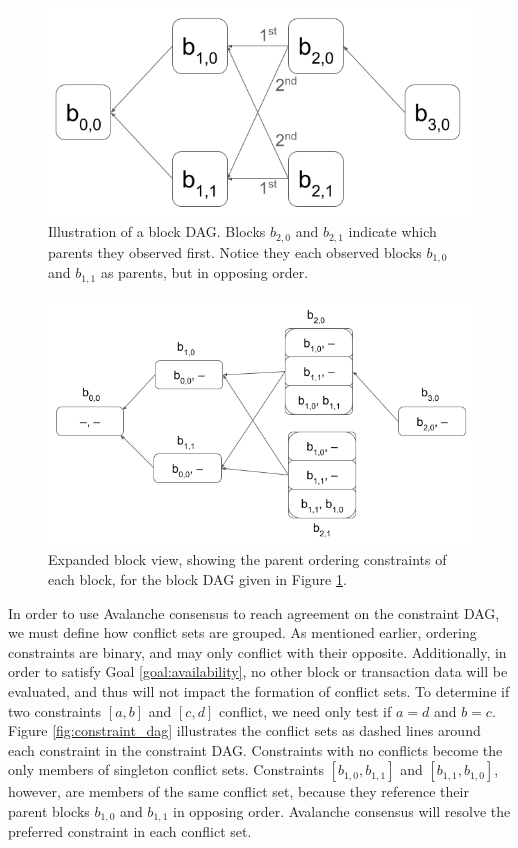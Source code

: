 \documentclass[12pt]{article}
\begin{document}
  \begin{figure}
    \centering
    \includegraphics[width=\columnwidth]{images/block_dag.png}
    \caption{Illustration of a block DAG. Blocks $b_{2,0}$ and $b_{2,1}$ indicate
      which parents they observed first. Notice they each observed blocks
      $b_{1,0}$ and $b_{1,1}$ as parents, but in opposing
      order.}\label{fig:block_dag}
  \end{figure}

  \begin{figure}
    \centering
    \includegraphics[width=\columnwidth]{images/block_dag_with_constraints.png}
    \caption{Expanded block view, showing the parent ordering constraints of
      each block, for the block DAG given in Figure \ref{fig:block_dag}.
      }\label{fig:block_dag_with_constraints}
  \end{figure}

  In order to use Avalanche consensus to reach agreement on the constraint DAG,
  we must define how conflict sets are grouped. As mentioned earlier, ordering
  constraints are binary, and may only conflict with their opposite.
  Additionally, in order to satisfy Goal \ref{goal:availability}, no other
  block or transaction data will be evaluated, and thus will not impact the
  formation of conflict sets. To determine if two constraints $[a, b]$ and $[c,
  d]$ conflict, we need only test if $a = d$ and $b = c$. Figure
  \ref{fig:constraint_dag} illustrates the conflict sets as dashed lines around
  each constraint in the constraint DAG. Constraints with no conflicts become
  the only members of singleton conflict sets. Constraints $[b_{1,0}, b_{1,1}]$
  and $[b_{1,1}, b_{1,0}]$, however, are members of the same conflict set,
  because they reference their parent blocks $b_{1,0}$ and $b_{1,1}$ in
  opposing order. Avalanche consensus will resolve the preferred constraint in
  each conflict set.
\end{document}
